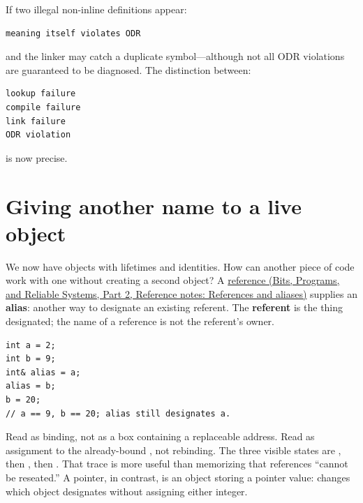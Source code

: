 If two illegal non-inline definitions appear:

\begin{verbatim}
meaning itself violates ODR
\end{verbatim}

and the linker may catch a duplicate symbol---although not all ODR violations are guaranteed to be diagnosed. The distinction between:

\begin{verbatim}
lookup failure
compile failure
link failure
ODR violation
\end{verbatim}

is now precise.

\section{Giving another name to a live object}\label{05-engine-i-ch003-giving-another-name-to-a-live-object}

\hypertarget{05-engine-i-ch003-giving-another-name-to-a-live-object}{}

We now have objects with lifetimes and identities. How can another piece of code work with one without creating a second object? A \href{../01-Bits-Programs-and-Reliable-Systems-P02/main.pdf\#nameddest=appendix-d6d562ca9fbb}{reference (Bits, Programs, and Reliable Systems, Part 2, Reference notes: References and aliases)} supplies an \textbf{alias}: another way to designate an existing referent. The \textbf{referent} is the thing designated; the name of a reference is not the referent's owner.

\begin{verbatim}
int a = 2;
int b = 9;
int& alias = a;
alias = b;
b = 20;
// a == 9, b == 20; alias still designates a.
\end{verbatim}

Read  as binding, not as a box containing a replaceable address. Read  as assignment to the already-bound , not rebinding. The three visible states are , then , then . That trace is more useful than memorizing that references ``cannot be reseated.'' A pointer, in contrast, is an object storing a pointer value:  changes which object  designates without assigning either integer.

